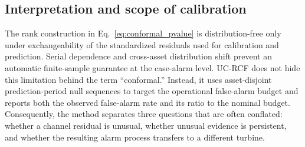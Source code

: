 \subsection{Interpretation and scope of calibration}

The rank construction in Eq.~\eqref{eq:conformal_pvalue} is distribution-free
only under exchangeability of the standardized residuals used for calibration
and prediction. Serial dependence and cross-asset distribution shift prevent an
automatic finite-sample guarantee at the case-alarm level. UC-RCF does not hide
this limitation behind the term ``conformal.'' Instead, it uses asset-disjoint
prediction-period null sequences to target the operational false-alarm budget
and reports both the observed false-alarm rate and its ratio to the nominal
budget. Consequently, the method separates three questions that are often
conflated: whether a channel residual is unusual, whether unusual evidence is
persistent, and whether the resulting alarm process transfers to a different
turbine.
